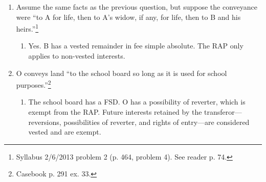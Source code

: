 \begin{enumerate}
    \item Assume the same facts as the previous question, but suppose the 
    conveyance were ``to A for life, then to A's widow, if any, for life, then 
    to B and his heirs.''\footnote{Syllabus 2/6/2013 problem 2 (p. 464, 
    problem 4). See reader p. 74.}
    \begin{enumerate}
        \item Yes. B has a vested remainder in fee simple absolute. The RAP 
        only applies to non-vested interests.
    \end{enumerate}
    \item O conveys land ``to the school board so long as it is used for 
    school purposes.''\footnote{Casebook p. 291 ex. 33.}
    \begin{enumerate}
        \item The school board has a FSD. O has a possibility of reverter, 
        which is exempt from the RAP. Future interests retained by the 
        transferor---reversions, possibilities of reverter, and rights of 
        entry---are considered vested and are exempt.
    \end{enumerate}
\end{enumerate}
